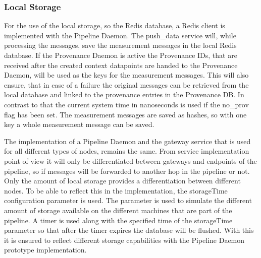 \subsubsection{Local Storage}
For the use of the local storage, so the Redis database, a Redis client is implemented with the Pipeline Daemon. The push\_data service will, while processing the messages, save the measurement messages in the local Redis database. If the Provenance Daemon is active the Provenance IDs, that are received after the created context datapoints are handed to the Provenance Daemon, will be used as the keys for the measurement messages. This will also ensure, that in case of a failure the original messages can be retrieved from the local database and linked to the provenance entries in the Provenance DB. In contrast to that the current system time in nanoseconds is used if the no\_prov flag has been set. The measurement messages are saved as hashes, so with one key a whole measurement message can be saved.

The implementation of a Pipeline Daemon and the gateway service that is used for all different types of nodes, remains the same. From service implementation point of view it will only be differentiated between gateways and endpoints of the pipeline, so if messages will be forwarded to another hop in the pipeline or not. Only the amount of local storage provides a differentiation between different nodes. To be able to reflect this in the implementation, the storageTime configuration parameter is used. The parameter is used to simulate the different amount of storage available on the different machines that are part of the pipeline. A timer is used along with the specified time of the storageTime parameter so that after the timer expires the database will be flushed. With this it is ensured to reflect different storage capabilities with the Pipeline Daemon prototype implementation.






